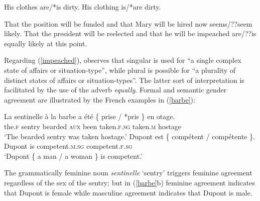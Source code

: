 \documentclass[output=paper
                ,modfonts
                ,nonflat
	        ,collection
	        ,collectionchapter
	        ,collectiontoclongg
 	        ,biblatex
                ,babelshorthands
                ,newtxmath
                ,draftmode
                ,colorlinks, citecolor=brown
]{./langsci/langscibook}
\begin{document}
{\begin{exe} 
\ex \label{clothes}
 \begin{xlist}
\ex   His clothes are/*is dirty.
\ex   His clothing is/*are dirty.
\end{xlist}
\end{exe}

\begin{exe} 
\ex \label{impeached}
 \begin{xlist}
\ex   That the position will be funded and that Mary will be hired now seems/??seem likely.
\ex  	That the president will be reelected and that he will be impeached are/??is equally likely at this point.
\end{xlist}
\end{exe}

\noindent
Regarding (\ref{impeached}), \citet[564--565]{Mccloskey:1991} observes that singular is used for ``a single complex state of affairs or situation-type'', while plural is possible for ``a plurality of distinct states of affairs or situation-types''.  The latter sort of interpretation is facilitated by the use of the adverb \textit{equally}.   Formal and semantic gender agreement are illustrated by the French examples in (\ref{barbe}):

\begin{exe} 
\ex \label{barbe}
 \begin{xlist}
\ex   
\gll   La sentinelle	{\`{a} la barbe}	a \'{e}t\'{e}	\{ prise / *pris \} 	{en otage}.  \\
		the.\textsc{f} sentry	bearded	\textsc{aux} been	
		{} taken.\textsc{f.sg} {} taken.\textsc{m}	 {} hostage \\
\glt		`The bearded sentry was taken hostage.’
\ex   
\gll   Dupont	est	\{ comp\'{e}tent /		comp\'{e}tente \}. \\
		Dupont	is	{} competent.\textsc{m.sg} {}	competent.\textsc{f.sg} {} \\
\glt		`Dupont \{ a man / a woman \} is competent.’
 \end{xlist}
\end{exe} 

\noindent
The grammatically feminine noun \textit{sentinelle} `sentry'  triggers feminine agreement regardless of the sex of the sentry; but in (\ref{barbe}b) feminine agreement indicates that Dupont is female while masculine agreement indicates that Dupont is male.  

}
\end{document}
